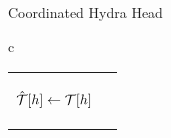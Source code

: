 \begin{figure*}[t!]
\begin{algobox}{Coordinated Hydra Head}
\begin{tabular}{c}
\begin{tabular}{c@{}c}
{\begin{walgo}{0.65}
{{              $\hat {\mathcal T}[h] \gets {\mathcal T}[h]$ \; %
            }
            
          }

          \vspace{12pt} %

          \On{$(\hpRS,s,T)$ %
            from $\party_j$}{ %

            \Req $s = \hats + 1$ %
            and $\hpLdr(s) = j$ \; %

            \Wait{$\bars = \hats$ %
              and $\barmU\applytx\Reach^{\mT}(T) \not= \bot$ %
            }{ %
               $\hats \gets \bars + 1$ \; %

               $\forall\tx\in\Reach^{\mT}(T)$:
                \Out $(\hpSeen,\tx)$ \; %
              
               $\hatmU \gets
               \Sno(\hats,\barmU\applytx\Reach^{\mT}(T))$ \; %

               $\msSig_i \gets %
               \msSign(\hyPr,\hatmU.h \| \hats)$ \; %
 
               \Send $(\hpAS,\hats,\msSig_i)$ %
               to $\party_j$ \; %

               \If{$\hpLdr(\hats+1) = i$}{
                 $\hatmT :\subseteq_{\mbox{max}} \mT$ s.t. $\hatmU\applytx\hatmT\not=\bot$ \; %
                 $\hatmL \gets \hatmU\applytx\hatmT$
               }
            }
           }
          
        \end{walgo}
        }
        &

        \adjustbox{valign=t,scale=\sfact}{
        \begin{walgo}{0.6}
          \On{$(\hpAS,s,\msSig_j)$ %
            from $\party_j$}{ %

            \Req $s \in \{\hats,\hats+1\}$ \; %

            \Wait{$\hats=s$
            }{ %
            
            \Req $\hatmU.\hpSigs[j] = \eps$ \; %

            $\hatmU.\hpSigs[j] \gets \msSig_j$ \; %

            \If{$\forall k: \hatmU.\hpSigs[k] \neq \eps$}{ %
              $\msCSig %
              \gets \msComb(\hatmU.\hash \| s, %
              \msVKL, \hatmU.\hpSigs)$ \; %
              
}}}
\end{walgo}}
\end{tabular}
\end{tabular}
\end{algobox}
\end{figure*}
